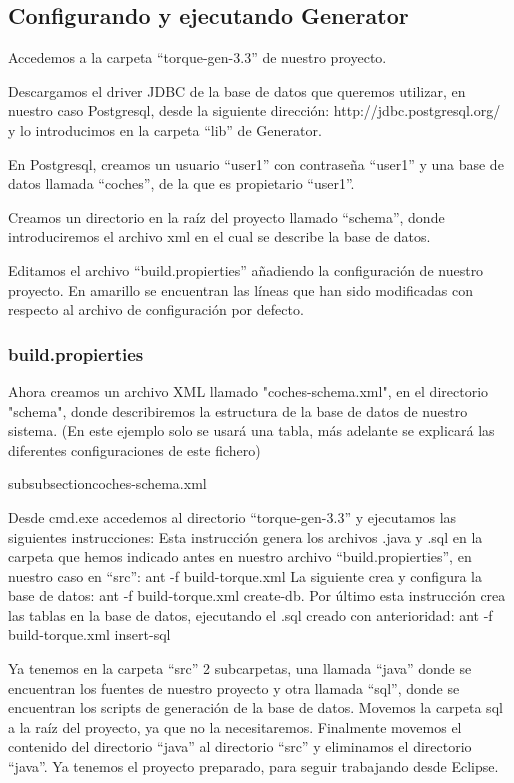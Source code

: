 \documentclass[12pt, oneside]{article}
\begin{document}
\subsection{Configurando y ejecutando Generator}
Accedemos a la carpeta “torque-gen-3.3” de nuestro proyecto.

Descargamos el driver JDBC de la base de datos que queremos utilizar, en nuestro caso Postgresql, desde la siguiente dirección: http://jdbc.postgresql.org/ y lo introducimos en la carpeta “lib” de Generator.

En Postgresql, creamos un usuario “user1” con contraseña “user1” y una base de datos llamada “coches”, de la que es propietario “user1”.

Creamos un directorio en la raíz del proyecto llamado “schema”, donde introduciremos el archivo xml en el cual se describe la base de datos.

Editamos el archivo “build.propierties” añadiendo la configuración de nuestro proyecto. En amarillo se encuentran las líneas que han sido modificadas con respecto al archivo de configuración por defecto.

\subsubsection{build.propierties}


Ahora creamos un archivo XML llamado "coches-schema.xml", en el directorio "schema", donde describiremos la estructura de la base de datos de nuestro sistema. (En este ejemplo solo se usará una tabla, más adelante se explicará las diferentes configuraciones de este fichero)

subsubsection{coches-schema.xml}


Desde cmd.exe accedemos al directorio “torque-gen-3.3” y ejecutamos las siguientes instrucciones: 
Esta instrucción genera los archivos .java y .sql en la carpeta que hemos indicado antes en nuestro archivo “build.propierties”, en nuestro caso en “src”: ant -f build-torque.xml 
La siguiente crea y configura la base de datos:  ant -f build-torque.xml create-db.
Por último esta instrucción crea las tablas en la base de datos, ejecutando el .sql creado con anterioridad: ant -f build-torque.xml insert-sql

Ya tenemos en la carpeta “src” 2 subcarpetas, una llamada “java” donde se encuentran los fuentes de nuestro proyecto y otra llamada “sql”, donde se encuentran los scripts de generación de la base de datos. Movemos la carpeta sql a la raíz del proyecto, ya que no la necesitaremos. Finalmente movemos el contenido del directorio “java” al directorio “src” y eliminamos el directorio “java”. Ya tenemos el proyecto preparado, para seguir trabajando desde Eclipse.
\end{document}
